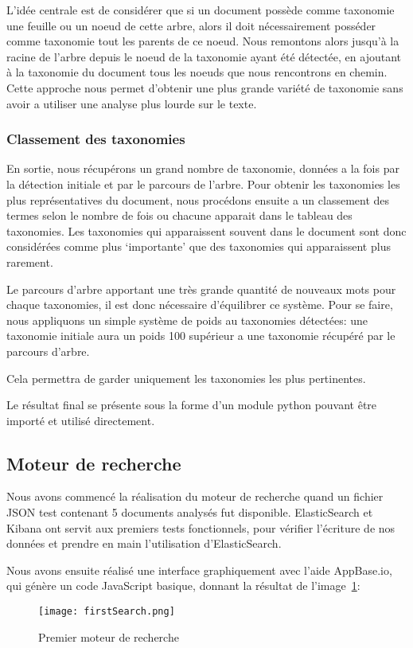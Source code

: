 L'idée centrale est de considérer que si un document possède comme taxonomie une feuille ou un noeud de cette arbre, alors il doit nécessairement posséder comme taxonomie tout les parents de ce noeud. 
Nous remontons alors jusqu'à la racine de l'arbre depuis le noeud de la taxonomie ayant été détectée, en ajoutant à la taxonomie du document tous les noeuds que nous rencontrons en chemin.
Cette approche nous permet d'obtenir une plus grande variété de taxonomie sans avoir a utiliser une analyse plus lourde sur le texte. 


\subsubsection{Classement des taxonomies}
En sortie, nous récupérons un grand nombre de taxonomie, données a la fois par la détection initiale et par le parcours de l'arbre.
Pour obtenir les taxonomies les plus représentatives du document, nous procédons ensuite a un classement des termes selon le nombre de fois ou chacune apparait dans le tableau des taxonomies.
Les taxonomies qui apparaissent souvent dans le document sont donc considérées comme plus `importante' que des taxonomies qui apparaissent plus rarement.

Le parcours d'arbre apportant une très grande quantité de nouveaux mots pour chaque taxonomies, il est donc nécessaire d'équilibrer ce système.
Pour se faire, nous appliquons un simple système de poids au taxonomies détectées: une taxonomie initiale aura un poids 100 supérieur a une taxonomie récupéré par le parcours d'arbre.

Cela permettra de garder uniquement les taxonomies les plus pertinentes.




Le résultat final se présente sous la forme d'un module python pouvant être importé et utilisé directement.



\subsection{Moteur de recherche}
Nous avons commencé la réalisation du moteur de recherche quand un fichier JSON test contenant 5 documents analysés fut disponible.
ElasticSearch et Kibana ont servit aux premiers tests fonctionnels, pour vérifier l'écriture de nos données et prendre en main l'utilisation d'ElasticSearch.

Nous avons ensuite réalisé une interface graphiquement avec l'aide AppBase.io, qui génère un code JavaScript basique, donnant la résultat de l'image~\ref{fig:firstSearch}:
\begin{figure}[h!]
  \centering
  \texttt{[image: firstSearch.png]}
	\caption[]{Premier moteur de recherche}
	\label{fig:firstSearch}
\end{figure}

